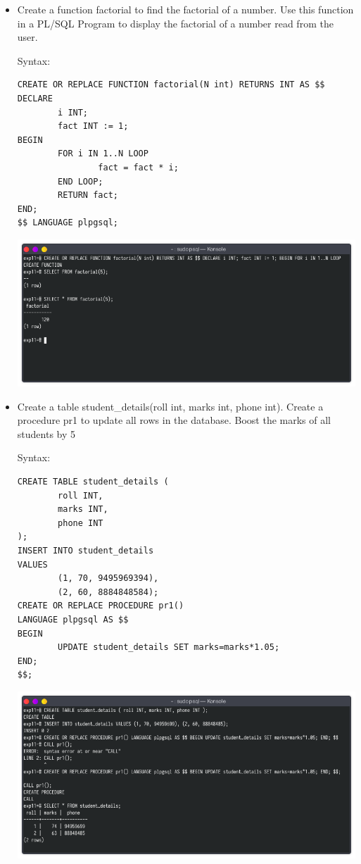 \documentclass[13pt,oneside]{book}
\begin{document}
\begin{itemize}
	\item
Create a function factorial to find the factorial of a number. Use this function in a
 PL/SQL Program to display the factorial of a number read from the user.
 
Syntax:
\begin{verbatim}
CREATE OR REPLACE FUNCTION factorial(N int) RETURNS INT AS $$
DECLARE
        i INT;
        fact INT := 1;
BEGIN
        FOR i IN 1..N LOOP
                fact = fact * i;
        END LOOP;
        RETURN fact;
END;
$$ LANGUAGE plpgsql;

\end{verbatim}
\includegraphics[width=\textwidth]{img/p11/ss1.png}


\item
Create a table student\_details(roll int, marks int, phone int). Create a procedure pr1
 to update all rows in the database. Boost the marks of all students by 5%
 
Syntax:
\begin{verbatim}
CREATE TABLE student_details (
        roll INT,
        marks INT,
        phone INT
);
INSERT INTO student_details 
VALUES
        (1, 70, 9495969394),
        (2, 60, 8884848584);
CREATE OR REPLACE PROCEDURE pr1()
LANGUAGE plpgsql AS $$
BEGIN
        UPDATE student_details SET marks=marks*1.05;
END;
$$;

\end{verbatim}
\includegraphics[width=\textwidth]{img/p11/ss2.png}



\end{itemize}
\end{document}
